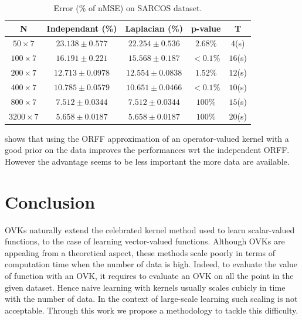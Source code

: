 \documentclass[twoside,11pt]{article}
\begin{document}
\begin{table}
    \centering
    \begin{tabular}{c|cccc}
        \toprule
            N & Independant (\%) & Laplacian (\%)& p-value & T \\
        \midrule
            $50\times 7$ & $23.138 \pm 0.577$ & $22.254\pm 0.536$ & $2.68\%$ &
            $4$(s) \\
            $100\times 7$ & $16.191 \pm 0.221$ & $15.568 \pm 0.187$ & $<0.1\%$
            & $16$(s) \\
            $200\times 7$ & $12.713 \pm 0.0978$ & $12.554 \pm 0.0838$ &
            $1.52\%$ & $12$(s) \\
            $400\times 7$ & $10.785 \pm 0.0579$ & $10.651 \pm 0.0466$ & $<
            0.1\%$ & $10$(s) \\
            $800\times 7$ & $7.512\pm 0.0344$ & $7.512\pm 0.0344$ & $100\%$ &
            $15$(s) \\
            $3200\times 7$ & $5.658 \pm 0.0187$ & $5.658 \pm 0.0187$ & $100\%$
            & $20$(s) \\
        \bottomrule
    \end{tabular}
    \caption{Error (\% of nMSE) on SARCOS dataset.}
    \label{table:sarcos}
\end{table}
 shows that using the \acs{ORFF} approximation of an
operator-valued kernel with a good prior on the data improves the performances
\acs{wrt} the independent \acs{ORFF}. However the advantage seems to be less
important the more data are available.


\section{Conclusion}
\label{sec:conclusion}
\acsp{OVK} naturally extend the celebrated kernel method used to learn
scalar-valued functions, to the case of learning vector-valued functions.
Although \acsp{OVK} are appealing from a theoretical aspect, these methods
scale poorly in terms of computation time when the number of data is high.
Indeed, to evaluate the value of function with an \acl{OVK}, it requires to
evaluate an \acl{OVK} on all the point in the given dataset.  Hence naive
learning with kernels usually scales cubicly in time with the number of data.
In the context of large-scale learning such scaling is not acceptable. Through
this work we propose a methodology to tackle this difficulty.
\end{document}
